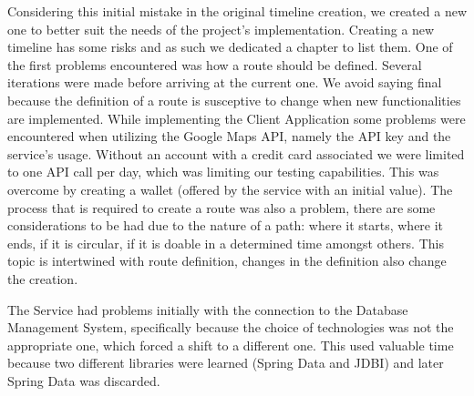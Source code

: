 \documentclass{article}
\begin{document}
        Considering this initial mistake in the original timeline creation, we created a new one to better suit the needs of the project's implementation.
        Creating a new timeline has some risks and as such we dedicated a chapter to list them.
        One of the first problems encountered was how a route should be defined. Several iterations were made before arriving at the current one. We avoid saying final
        because the definition of a route is susceptive to change when new functionalities are implemented.
        While implementing the Client Application some problems were encountered when utilizing the Google Maps API, namely the API key and the service's usage. 
        Without an account with a credit card associated we were limited to one API call per day, which was limiting our testing capabilities. This was overcome by creating a wallet (offered by the service with an initial value).
        The process that is required to create a route was also a problem, there are some considerations to be had due to the nature of a path: where it starts, where it ends, if it is circular, if it is doable in a determined time amongst others.
        This topic is intertwined with route definition, changes in the definition also change the creation.\par
 
        The Service had problems initially with the connection to the Database Management System, specifically because the choice of technologies was not the appropriate one, which
        forced a shift to a different one. This used valuable time because two different libraries were learned (Spring Data and JDBI) and later Spring Data was discarded.


        \newpage    
    
    \printbibliography
\end{document}
